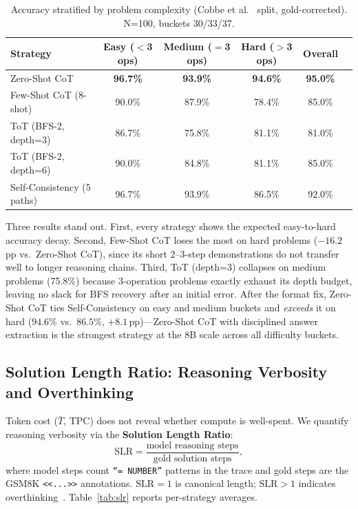 ﻿\documentclass[runningheads]{llncs}
\begin{document}
\begin{table}[H]
\centering
\caption{Accuracy stratified by problem complexity
(Cobbe et al.~\cite{cobbe2021gsm8k} split, gold-corrected).
N=100, buckets 30/33/37.}
\label{tab:strat}
\begin{tabular}{@{}lccccc@{}}
\toprule
\textbf{Strategy} &
\textbf{Easy ($<$3 ops)} &
\textbf{Medium ($=$3 ops)} &
\textbf{Hard ($>$3 ops)} &
\textbf{Overall} \\
\midrule
Zero-Shot CoT             & \textbf{96.7\%} & \textbf{93.9\%} & \textbf{94.6\%} & \textbf{95.0\%} \\
Few-Shot CoT (8-shot)     & 90.0\% & 87.9\% & 78.4\% & 85.0\% \\
ToT (BFS-2, depth=3)      & 86.7\% & 75.8\% & 81.1\% & 81.0\% \\
ToT (BFS-2, depth=6)      & 90.0\% & 84.8\% & 81.1\% & 85.0\% \\
Self-Consistency (5 paths)& 96.7\% & 93.9\% & 86.5\% & 92.0\% \\
\bottomrule
\end{tabular}
\end{table}

Three results stand out.
First, every strategy shows the expected easy-to-hard accuracy decay.
Second, Few-Shot CoT loses the most on hard problems ($-16.2$\,pp vs.\
Zero-Shot CoT), since its short 2--3-step demonstrations do not
transfer well to longer reasoning chains.
Third, ToT (depth=3) collapses on medium problems (75.8\%) because
3-operation problems exactly exhaust its depth budget, leaving no slack
for BFS recovery after an initial error.
After the format fix, Zero-Shot CoT ties Self-Consistency on easy and
medium buckets and \emph{exceeds} it on hard ($94.6\%$ vs.\ $86.5\%$,
$+8.1$\,pp)---Zero-Shot CoT with disciplined answer extraction is the
strongest strategy at the 8B scale across all difficulty buckets.

\subsection{Solution Length Ratio: Reasoning Verbosity and Overthinking}
\label{sec:results:slr}

Token cost ($\bar{T}$, TPC) does not reveal whether compute is
well-spent.
We quantify reasoning verbosity via the \textbf{Solution Length Ratio}:
\begin{equation}
\text{SLR} = \frac{\text{model reasoning steps}}{\text{gold solution steps}},
\end{equation}
where model steps count \texttt{``= NUMBER''} patterns in the trace
and gold steps are the GSM8K \texttt{<<...>>} annotations.
$\text{SLR}=1$ is canonical length; $\text{SLR}>1$ indicates
overthinking~\cite{wu2025whenmoreisless}.
Table~\ref{tab:slr} reports per-strategy averages.
\end{document}
